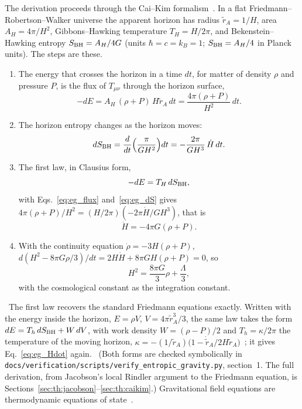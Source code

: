 The derivation proceeds through the Cai--Kim formalism~\cite{CaiKim2005}. In a flat Friedmann--Robertson--Walker universe the apparent horizon has radius
$\tilde r_A=1/H$, area $A_H=4\pi/H^2$, Gibbons--Hawking temperature $T_H=H/2\pi$, and Bekenstein--Hawking entropy $S_{\rm BH}=A_H/4G$ (units
$\hbar=c=k_B=1$; $S_{\rm BH}=A_H/4$ in Planck units). The steps are these.
\begin{enumerate}
\item The energy that crosses the horizon in a time $dt$, for matter of density $\rho$ and pressure $P$, is the flux of $T_{\mu\nu}$ through the horizon
surface,
\begin{equation}-dE=A_H\,(\rho+P)\,H\tilde r_A\,dt=\frac{4\pi(\rho+P)}{H^2}\,dt .\label{eq:eg_flux}\end{equation}
\item The horizon entropy changes as the horizon moves:
\begin{equation}dS_{\rm BH}=\frac{d}{dt}\Big(\frac{\pi}{GH^2}\Big)dt=-\frac{2\pi}{GH^3}\,\dot H\,dt .\label{eq:eg_dS}\end{equation}
\item The first law, in Clausius form,
\begin{equation}-dE=T_H\,dS_{\rm BH},\label{eq:eg_firstlaw}\end{equation}
with Eqs.~\eqref{eq:eg_flux} and~\eqref{eq:eg_dS} gives $4\pi(\rho+P)/H^2=(H/2\pi)(-2\pi\dot H/GH^3)$, that is
\begin{equation}\dot H=-4\pi G(\rho+P).\label{eq:eg_Hdot}\end{equation}
\item With the continuity equation $\dot\rho=-3H(\rho+P)$, $d(H^2-8\pi G\rho/3)/dt=2H\dot H+8\pi GH(\rho+P)=0$, so
\begin{equation}H^2=\frac{8\pi G}{3}\rho+\frac\Lambda3 ,\label{eq:eg_friedmann}\end{equation}
with the cosmological constant as the integration constant.
\end{enumerate}
\derived\ The first law recovers the standard Friedmann equations exactly. Written with the energy inside the horizon, $E=\rho V$, $V=4\pi\tilde r_A^3/3$,
the same law takes the form $dE=T_h\,dS_{\rm BH}+W\,dV$, with work density $W=(\rho-P)/2$ and $T_h=\kappa/2\pi$ the temperature of the moving horizon,
$\kappa=-(1/\tilde r_A)\big(1-\dot{\tilde r}_A/2H\tilde r_A\big)$~\cite{AkbarCai2007}; it gives Eq.~\eqref{eq:eg_Hdot} again. \derived\ (Both forms are checked
symbolically in \texttt{docs/\allowbreak{}verification/\allowbreak{}scripts/\allowbreak{}verify\_entropic\_gravity.py}, section~1. The full derivation, from
Jacobson's local Rindler argument to the Friedmann equation, is Sections~\ref{sec:th:jacobson}--\ref{sec:th:caikim}.) Gravitational field equations are
thermodynamic equations of state~\cite{Jacobson1995}.

